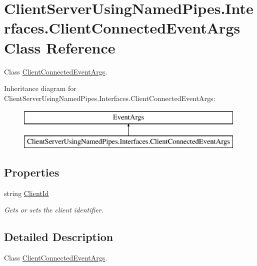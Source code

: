 \hypertarget{class_client_server_using_named_pipes_1_1_interfaces_1_1_client_connected_event_args}{}\section{Client\+Server\+Using\+Named\+Pipes.\+Interfaces.\+Client\+Connected\+Event\+Args Class Reference}
\label{class_client_server_using_named_pipes_1_1_interfaces_1_1_client_connected_event_args}


Class \hyperlink{class_client_server_using_named_pipes_1_1_interfaces_1_1_client_connected_event_args}{Client\+Connected\+Event\+Args}.  


Inheritance diagram for Client\+Server\+Using\+Named\+Pipes.\+Interfaces.\+Client\+Connected\+Event\+Args\+:\begin{figure}[H]
\begin{center}
\leavevmode
\includegraphics[height=2.000000cm]{class_client_server_using_named_pipes_1_1_interfaces_1_1_client_connected_event_args}
\end{center}
\end{figure}
\subsection*{Properties}
\begin{DoxyCompactItemize}
\item 
string \hyperlink{class_client_server_using_named_pipes_1_1_interfaces_1_1_client_connected_event_args_a7b9634a42796e554e65e6de7256aa6ed}{Client\+Id}
\begin{DoxyCompactList}\small\item\em Gets or sets the client identifier. \end{DoxyCompactList}\end{DoxyCompactItemize}


\subsection{Detailed Description}
Class \hyperlink{class_client_server_using_named_pipes_1_1_interfaces_1_1_client_connected_event_args}{Client\+Connected\+Event\+Args}. 

